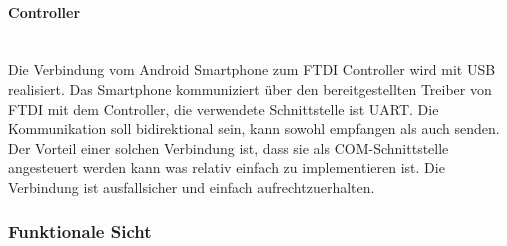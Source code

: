 		\paragraph{Controller}$~~$\vspace{2mm}\\
		Die Verbindung vom Android Smartphone zum FTDI Controller wird mit USB realisiert. 
		Das Smartphone kommuniziert über den bereitgestellten Treiber von FTDI mit dem 
		Controller, die verwendete Schnittstelle ist UART. Die Kommunikation soll 
		bidirektional sein, kann sowohl empfangen als auch senden. Der Vorteil einer 
		solchen Verbindung ist, dass sie als COM-Schnittstelle angesteuert werden kann was 
		relativ einfach zu implementieren ist. Die Verbindung ist ausfallsicher und einfach 
		aufrechtzuerhalten.		
		
	\subsubsection{Funktionale Sicht}
	

